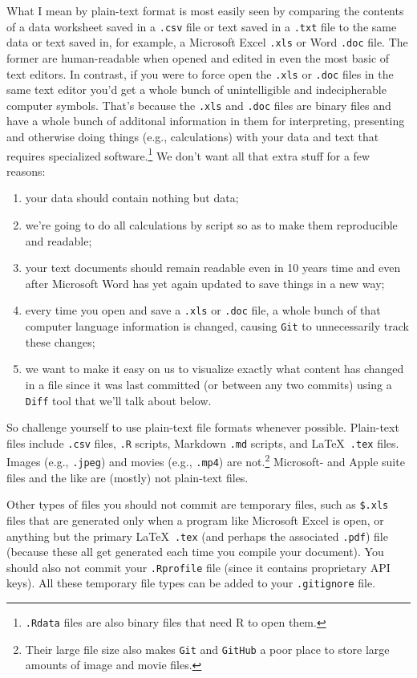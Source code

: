 \documentclass[12pt,letterpaper]{article}
\begin{document}
What I mean by plain-text format is most easily seen by comparing the contents of a data worksheet saved in a \texttt{.csv} file or text saved in a \texttt{.txt} file to the same data or text saved in, for example, a Microsoft Excel \texttt{.xls} or Word \texttt{.doc} file.
The former are human-readable when opened and edited in even the most basic of text editors.
In contrast, if you were to force open the \texttt{.xls} or \texttt{.doc} files in the same text editor you'd get a whole bunch of unintelligible and indecipherable computer symbols.
That's because the \texttt{.xls} and \texttt{.doc} files are binary files and have a whole bunch of additonal information in them for interpreting, presenting and otherwise doing things (e.g., calculations) with your data and text that requires specialized software.\footnote{\texttt{.Rdata} files are also binary files that need R to open them.}
We don't want all that extra stuff for a few reasons:
\begin{enumerate}
 	\item your data should contain nothing but data;
	\item we're going to do all calculations by script so as to make them reproducible and readable;
	\item your text documents should remain readable even in 10 years time and even after Microsoft Word has yet again updated to save things in a new way;
 	\item every time you open and save a \texttt{.xls} or \texttt{.doc} file, a whole bunch of that computer language information is changed, causing \texttt{Git} to unnecessarily track these changes;
	\item we want to make it easy on us to visualize exactly what content has changed in a file since it was last committed (or between any two commits) using a \texttt{Diff} tool that we'll talk about below.
\end{enumerate}
So challenge yourself to use plain-text file formats whenever possible.
Plain-text files include \texttt{.csv} files, \texttt{.R} scripts, Markdown \texttt{.md} scripts, and \LaTeX\ \texttt{.tex} files.
Images (e.g., \texttt{.jpeg}) and movies (e.g., \texttt{.mp4}) are not.\footnote{Their large file size also makes \texttt{Git} and \texttt{GitHub} a poor place to store large amounts of image and movie files.}
Microsoft- and Apple suite files and the like are (mostly) not plain-text files.

Other types of files you should not commit are temporary files, such as \texttt{\$.xls} files that are generated only when a program like Microsoft Excel is open, or anything but the primary \LaTeX\ \texttt{.tex} (and perhaps the associated \texttt{.pdf}) file (because these all get generated each time you compile your document).
You should also not commit your \texttt{.Rprofile} file (since it contains proprietary API keys).
All these temporary file types can be added to your \texttt{.gitignore} file.
\end{document}
